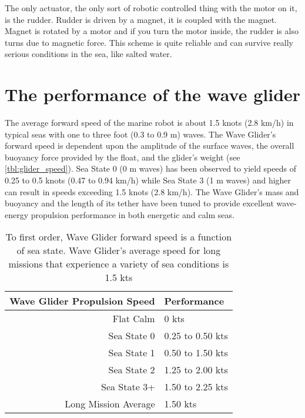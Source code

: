 The only actuator, the only sort of robotic controlled thing with the motor on it, is the rudder. Rudder is driven by a magnet, it is coupled with the magnet. Magnet is rotated by a motor and if you turn the motor inside, the rudder is also turns due to magnetic force. This scheme is quite reliable and can survive really serious conditions in the sea, like salted water.



\section{The performance of the wave glider}


The average forward speed of the marine robot is about 1.5 knots (2.8 km/h) in typical seas with one to three foot (0.3 to 0.9 m) waves. The Wave Glider’s forward speed is dependent upon the amplitude of the surface waves, the overall buoyancy force provided by the float, and the glider’s weight (see \autoref{tbl:glider_speed}). Sea State 0 (0 m waves) has been observed to yield speeds of 0.25 to 0.5 knots (0.47 to 0.94 km/h) while Sea State 3 (1 m waves) and higher can result in speeds exceeding 1.5 knots (2.8 km/h). The Wave Glider’s mass and buoyancy  and the length of its tether have been tuned to provide excellent wave-energy propulsion performance in both energetic and calm seas.
\begin{table}[h]
	\centering	
	\begin{tabular}[h]{|r|l|}
		\hline
		\textbf{Wave Glider Propulsion Speed} & 
		\textbf{Performance} 	
	    	\tabularnewline

		\hline
			Flat Calm & 0 kts	
	    	\tabularnewline
	    	
	    	\hline
			Sea State 0 & 0.25 to 0.50 kts	
	    	\tabularnewline

	    	\hline
			Sea State 1 & 0.50 to 1.50 kts	
	    	\tabularnewline

	    	\hline
			Sea State 2 & 1.25 to 2.00 kts	
	    	\tabularnewline

		\hline
			Sea State 3+ & 1.50 to 2.25 kts	
	    	\tabularnewline

	    	\hline
			Long Mission Average & 1.50 kts	
	    	\tabularnewline
	    	
	    	\hline
	  
	\end{tabular} 
	\caption{ To first order, Wave Glider forward speed  is a function of sea state. Wave Glider's average speed for long missions that experience a variety of sea conditions is 1.5 kts}
	\label{tbl:glider_speed}
\end{table} 

